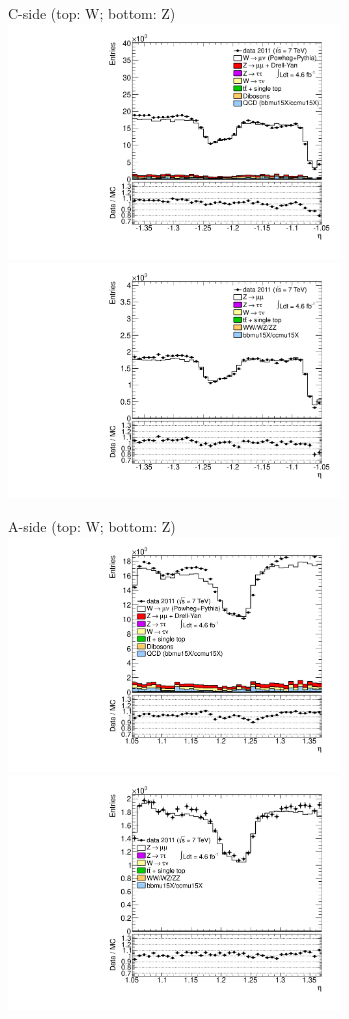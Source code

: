 {

\colb[T]

C-side (top: W; bottom: Z)
\centering
\includegraphics[width=0.66\textwidth]{dates/20130306/figures/etaphi/W_6_C_stack_l_eta_POS} \\
\includegraphics[width=0.66\textwidth]{dates/20130306/figures/etaphi/Z_6_C_stack_lP_eta_ALL.pdf}

A-side (top: W; bottom: Z)
\centering
\includegraphics[width=0.66\textwidth]{dates/20130306/figures/etaphi/W_6_A_stack_l_eta_POS} \\
\includegraphics[width=0.66\textwidth]{dates/20130306/figures/etaphi/Z_6_A_stack_lP_eta_ALL.pdf} 

\cole
}


